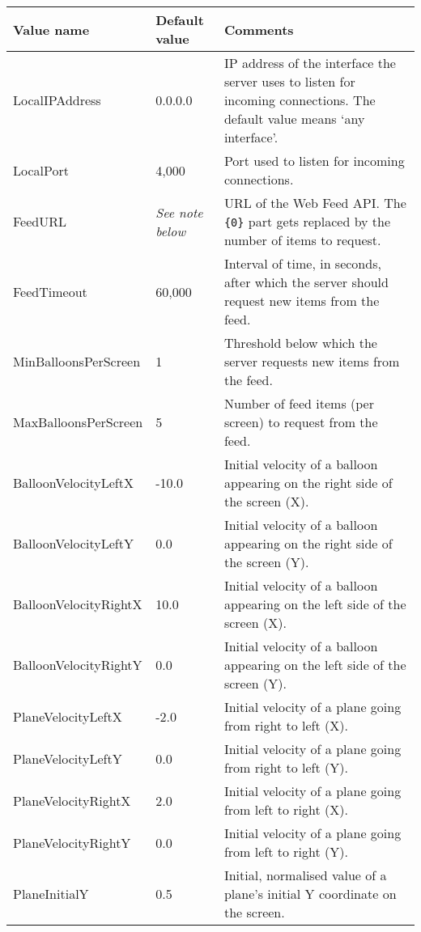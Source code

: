 \begin{tabular}{|p{5.0cm}|p{3.0cm}|p{7.6cm}|}

\hline Value name & Default value & Comments \\ \hline

LocalIPAddress & 0.0.0.0 & IP address of the interface the server uses to listen for incoming connections. The default value means `any interface'. \\ \hline

LocalPort & 4,000 & Port used to listen for incoming connections. \\ \hline

FeedURL & \emph{See note below} & URL of the Web Feed API. The \verb${0}$ part gets replaced by the number of items to request. \\ \hline

FeedTimeout & 60,000 & Interval of time, in seconds, after which the server should request new items from the feed. \\ \hline

MinBalloonsPerScreen & 1 & Threshold below which the server requests new items from the feed. \\ \hline

MaxBalloonsPerScreen & 5 & Number of feed items (per screen) to request from the feed. \\ \hline

BalloonVelocityLeftX & -10.0 & Initial velocity of a balloon appearing on the right side of the screen (X). \\ \hline

BalloonVelocityLeftY & 0.0 & Initial velocity of a balloon appearing on the right side of the screen (Y). \\ \hline

BalloonVelocityRightX & 10.0 & Initial velocity of a balloon appearing on the left side of the screen (X). \\ \hline

BalloonVelocityRightY & 0.0 & Initial velocity of a balloon appearing on the left side of the screen (Y). \\ \hline

PlaneVelocityLeftX & -2.0 & Initial velocity of a plane going from right to left (X). \\ \hline

PlaneVelocityLeftY & 0.0 & Initial velocity of a plane going from right to left (Y). \\ \hline

PlaneVelocityRightX & 2.0 & Initial velocity of a plane going from left to right (X). \\ \hline

PlaneVelocityRightY & 0.0 & Initial velocity of a plane going from left to right (Y). \\ \hline

PlaneInitialY & 0.5 & Initial, normalised value of a plane's initial Y coordinate on the screen. \\ \hline

\end{tabular}

